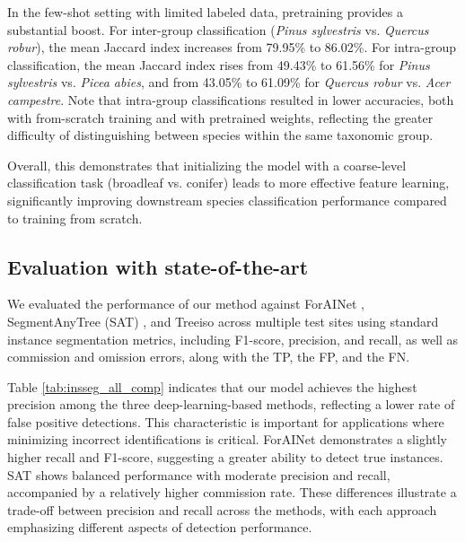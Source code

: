 \documentclass[review,authoryear]{elsarticle}
\begin{document}
In the few-shot setting with limited labeled data, pretraining provides a substantial boost. For inter-group classification (\textit{Pinus sylvestris} vs. \textit{Quercus robur}), the mean Jaccard index increases from 79.95\% to 86.02\%. For intra-group classification, the mean Jaccard index rises from 49.43\% to 61.56\% for \textit{Pinus sylvestris} vs. \textit{Picea abies}, and from 43.05\% to 61.09\% for \textit{Quercus robur} vs. \textit{Acer campestre}. Note that intra-group classifications resulted in lower accuracies, both with from-scratch training and with pretrained weights, reflecting the greater difficulty of distinguishing between species within the same taxonomic group. 

Overall, this demonstrates that initializing the model with a coarse-level classification task (broadleaf vs. conifer) leads to more effective feature learning, significantly improving downstream species classification performance compared to training from scratch.



\subsection{Evaluation with state-of-the-art}
We evaluated the performance of our method against ForAINet \citep{XIANG2024114078}, SegmentAnyTree (SAT) \citep{WIELGOSZ2024114367}, and Treeiso \citep{rs14236116} across multiple test sites using standard instance segmentation metrics, including F1-score, precision, and recall, as well as commission and omission errors, along with the TP, the FP, and the FN.

Table \ref{tab:insseg_all_comp} indicates that our model achieves the highest precision among the three deep-learning-based methods, reflecting a lower rate of false positive detections. This characteristic is important for applications where minimizing incorrect identifications is critical. ForAINet demonstrates a slightly higher recall and F1-score, suggesting a greater ability to detect true instances. SAT shows balanced performance with moderate precision and recall, accompanied by a relatively higher commission rate. These differences illustrate a trade-off between precision and recall across the methods, with each approach emphasizing different aspects of detection performance. 
\end{document}
